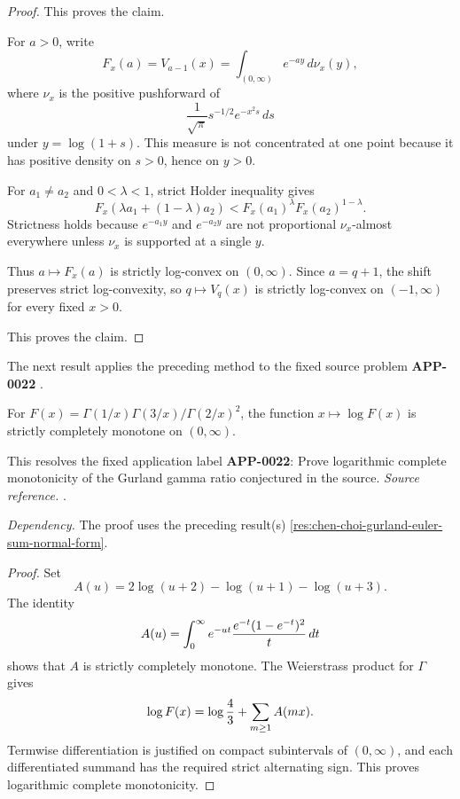 \begin{proof}
This proves the claim.

For \(a>0\), write
\[
F_x(a)=V_{a-1}(x)
=\int_{(0,\infty)} e^{-ay}\,d\nu_x(y),
\]
where \(\nu_x\) is the positive pushforward of
\[
\frac1{\sqrt\pi}s^{-1/2}e^{-x^2s}\,ds
\]
under \(y=\log(1+s)\). This measure is not concentrated at one point because it has positive density on \(s>0\), hence on \(y>0\).

For \(a_1\ne a_2\) and \(0<\lambda<1\), strict Holder inequality gives
\[
F_x(\lambda a_1+(1-\lambda)a_2)
<
F_x(a_1)^\lambda F_x(a_2)^{1-\lambda}.
\]
Strictness holds because \(e^{-a_1y}\) and \(e^{-a_2y}\) are not proportional \(\nu_x\)-almost everywhere unless \(\nu_x\) is supported at a single \(y\).

Thus \(a\mapsto F_x(a)\) is strictly log-convex on \((0,\infty)\). Since \(a=q+1\), the shift preserves strict log-convexity, so \(q\mapsto V_q(x)\) is strictly log-convex on \((-1,\infty)\) for every fixed \(x>0\).

This proves the claim.
\end{proof}

The next result applies the preceding method to the fixed source problem \textbf{APP-0022} \cite{chen-choi-gurland}.
\begin{corollary}
\label{res:chen-choi-gurland-logf-strict-cm}
For \(F(x)=\Gamma(1/x)\Gamma(3/x)/\Gamma(2/x)^2\), the function \(x\mapsto\log F(x)\) is strictly completely monotone on \((0,\infty)\).

This resolves the fixed application label \textbf{APP-0022}: Prove logarithmic complete monotonicity of the Gurland gamma ratio conjectured in the source.
\emph{Source reference.} \cite{chen-choi-gurland}.

\emph{Dependency.} The proof uses the preceding result(s) \ref{res:chen-choi-gurland-euler-sum-normal-form}.
\end{corollary}
\begin{proof}
Set
\[
  A(u)=2\log(u+2)-\log(u+1)-\log(u+3).
\]
The identity
\[
 A(u)=\int_0^\infty e^{-ut}{e^{-t}(1-e^{-t})^2\over t}\,dt
\]
shows that \(A\) is strictly completely monotone.  The Weierstrass product for
\(\Gamma\) gives
\[
  \log F(x)=\log {4\over3}+\sum_{m\ge1}A(mx).
\]
Termwise differentiation is justified on compact subintervals of
\((0,\infty)\), and each differentiated summand has the required strict
alternating sign.  This proves logarithmic complete monotonicity.
\end{proof}

